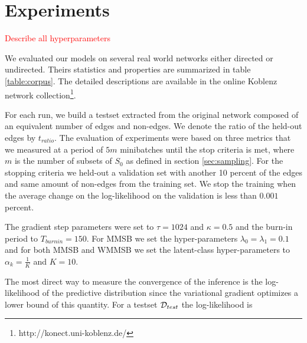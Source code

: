 \section{Experiments}

%
%

\textcolor{red}{Describe all hyperparameters}


We evaluated our models on several real world networks either directed or undirected. Theirs statistics and properties are summarized in table \ref{table:corpus}. The detailed descriptions are available in the online Koblenz network collection\footnote{http://konect.uni-koblenz.de/}.

\begin{table}[h]
\bgroup
\def\arraystretch{1} %
	
\egroup
\label{table:corpus}
\end{table}


%
%

For each run, we build a testset extracted from the original network composed of an equivalent number of edges and non-edges. We denote the ratio of the held-out edges by $t_{ratio}$. The evaluation of experiments were based on three metrics that we measured at a period of $5m$ minibatches until the stop criteria is met, where $m$ is the number of subsets of $S_0$ as defined in section \ref{sec:sampling}. For the stopping criteria we held-out a validation set with another 10 percent of the edges and same amount of non-edges from the training set. We stop the training when the average change on the log-likelihood on the validation is less than $0.001$ percent.

The gradient step parameters were set to $\tau=1024$ and $\kappa=0.5$ and the burn-in period  to $T_{burnin}=150$. For MMSB we set the hyper-parameters $\lambda_0=\lambda_1=0.1$ and for both MMSB and WMMSB we set the latent-class hyper-parameters to $\alpha_k=\frac{1}{K}$ and $K=10$.


%
%

The most direct way to measure the convergence of the inference is the log-likelihood of the predictive distribution since the variational gradient optimizes a lower bound of this quantity. For a testset $\mathcal{D}_{test}$ the log-likelihood is

\begin{figure}[h]
\centering
	
    \label{fig:conv_entropy}
\end{figure}

